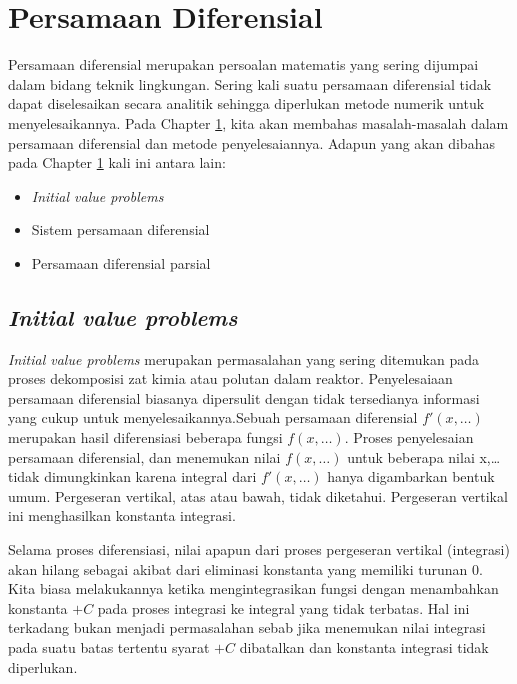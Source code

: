 \documentclass[]{book}
\providecommand{\tightlist}{%
  \setlength{\itemsep}{0pt}\setlength{\parskip}{0pt}}
\theoremstyle{definition}
\theoremstyle{definition}
\theoremstyle{definition}
\theoremstyle{remark}
\begin{document}
\hypertarget{diffeq}{%
\chapter{Persamaan Diferensial}\label{diffeq}}

Persamaan diferensial merupakan persoalan matematis yang sering dijumpai dalam bidang teknik lingkungan. Sering kali suatu persamaan diferensial tidak dapat diselesaikan secara analitik sehingga diperlukan metode numerik untuk menyelesaikannya. Pada Chapter \ref{diffeq}, kita akan membahas masalah-masalah dalam persamaan diferensial dan metode penyelesaiannya. Adapun yang akan dibahas pada Chapter \ref{diffeq} kali ini antara lain:

\begin{itemize}
\tightlist
\item
  \emph{Initial value problems}
\item
  Sistem persamaan diferensial
\item
  Persamaan diferensial parsial
\end{itemize}

\hypertarget{ivp}{%
\section{\texorpdfstring{\emph{Initial value problems}}{Initial value problems}}\label{ivp}}

\emph{Initial value problems} merupakan permasalahan yang sering ditemukan pada proses dekomposisi zat kimia atau polutan dalam reaktor. Penyelesaiaan persamaan diferensial biasanya dipersulit dengan tidak tersedianya informasi yang cukup untuk menyelesaikannya.Sebuah persamaan diferensial \(f'\left(x,\dots\right)\) merupakan hasil diferensiasi beberapa fungsi \(f\left(x,\dots\right)\). Proses penyelesaian persamaan diferensial, dan menemukan nilai \(f \left(x,\dots\right)\) untuk beberapa nilai x,\ldots{} tidak dimungkinkan karena integral dari \(f'\left(x,\dots\right)\) hanya digambarkan bentuk umum. Pergeseran vertikal, atas atau bawah, tidak diketahui. Pergeseran vertikal ini menghasilkan konstanta integrasi.

Selama proses diferensiasi, nilai apapun dari proses pergeseran vertikal (integrasi) akan hilang sebagai akibat dari eliminasi konstanta yang memiliki turunan 0. Kita biasa melakukannya ketika mengintegrasikan fungsi dengan menambahkan konstanta \(+ C\) pada proses integrasi ke integral yang tidak terbatas. Hal ini terkadang bukan menjadi permasalahan sebab jika menemukan nilai integrasi pada suatu batas tertentu syarat \(+ C\) dibatalkan dan konstanta integrasi tidak diperlukan.
\end{document}
